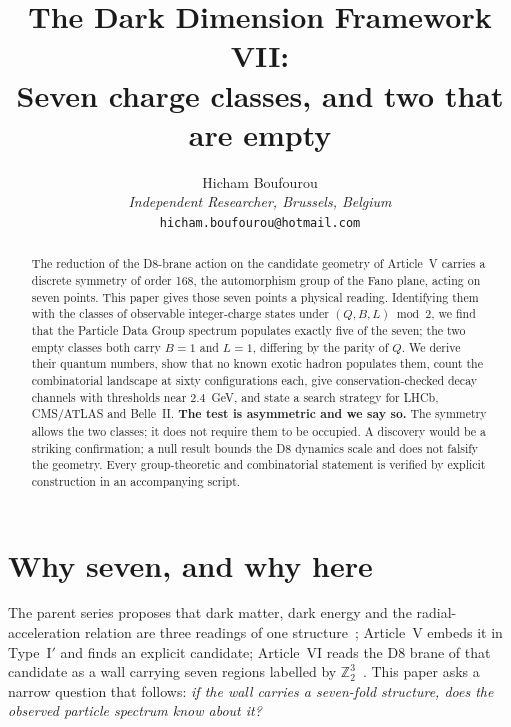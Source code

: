 
\graphicspath{{figures/}{../figures/}}
\title{\textbf{The Dark Dimension Framework VII:\\ Seven charge classes, and two that are empty}}
\author{Hicham Boufourou\\ \small\textit{Independent Researcher, Brussels, Belgium}\\ \small\texttt{hicham.boufourou@hotmail.com}}
\maketitle
\begin{abstract}
\noindent The reduction of the D8-brane action on the candidate geometry of Article~V carries a discrete symmetry of order 168, the automorphism group of the Fano plane, acting on seven points. This paper gives those seven points a physical reading. Identifying them with the classes of observable integer-charge states under $(Q,B,L)\bmod2$, we find that the Particle Data Group spectrum populates exactly five of the seven; the two empty classes both carry $B=1$ and $L=1$, differing by the parity of $Q$. We derive their quantum numbers, show that no known exotic hadron populates them, count the combinatorial landscape at sixty configurations each, give conservation-checked decay channels with thresholds near $2.4$~GeV, and state a search strategy for LHCb, CMS/ATLAS and Belle~II. \textbf{The test is asymmetric and we say so.} The symmetry allows the two classes; it does not require them to be occupied. A discovery would be a striking confirmation; a null result bounds the D8 dynamics scale and does not falsify the geometry. Every group-theoretic and combinatorial statement is verified by explicit construction in an accompanying script.
\end{abstract}

\section{Why seven, and why here}
The parent series proposes that dark matter, dark energy and the radial-acceleration relation are three readings of one structure~\cite{DDF1}; Article~V embeds it in Type~I$'$ and finds an explicit candidate; Article~VI reads the D8 brane of that candidate as a wall carrying seven regions labelled by $\mathbb Z_2^3$~\cite{DDF6}. This paper asks a narrow question that follows: \emph{if the wall carries a seven-fold structure, does the observed particle spectrum know about it?}

